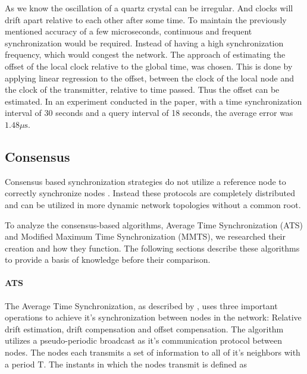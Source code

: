 \documentclass[a4paper,12pt]{article}
\begin{document}
    
    As we know the oscillation of a quartz crystal can be irregular. And clocks will drift apart relative to each other after some time. To maintain the previously mentioned accuracy of a few microseconds, continuous and frequent synchronization would be required. Instead of having a high synchronization frequency, which would congest the network. The approach of estimating the offset of the local clock relative to the global time, was chosen. This is done by applying linear regression to the offset, between the clock of the local node and the clock of the transmitter, relative to time passed. Thus the offset can be estimated. In an experiment conducted in the paper, with a time synchronization interval of 30 seconds and a query interval of 18 seconds, the average error was $1.48 \mu \text{s}$.
    
    
    \subsection{Consensus}
    Consensus based synchronization strategies do not utilize a reference node to correctly synchronize nodes \cite{HeLiChenCheng13}. Instead these protocols are completely distributed and can be utilized in more dynamic network topologies without a common root.
    
    To analyze the consensus-based algorithms, Average Time Synchronization (ATS) and Modified Maximum Time Synchronization (MMTS), we researched their creation and how they function. The following sections describe these algorithms to provide a basis of knowledge before their comparison.
    
    \paragraph{ATS} The Average Time Synchronization, as described by \citet{SchenatoFiorentin11}, uses three important operations to achieve it's synchronization between nodes in the network: Relative drift estimation, drift compensation and offset compensation. The algorithm utilizes a pseudo-periodic broadcast as it's communication protocol between nodes. The nodes each transmits a set of information to all of it's neighbors with a period $\mathrm{T}$. The instants in which the nodes transmit is defined as 
    
\end{document}
